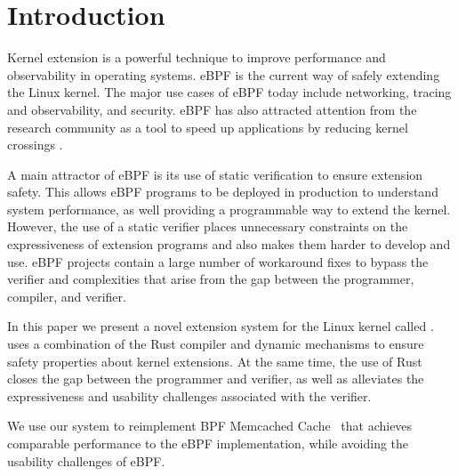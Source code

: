 \section{Introduction}
Kernel extension is a powerful technique to improve performance and
    observability in operating systems.
eBPF is the current way of safely extending the Linux kernel.
The major use cases of eBPF today include networking, tracing and 
    observability, and security.
eBPF has also attracted attention from the research community as
    a tool to speed up applications by reducing kernel crossings \cite{bmc,electrode,bpfxrp}.

A main attractor of eBPF is its use of static verification to ensure extension safety.
This allows eBPF programs to be deployed in production to understand system performance,
    as well providing a programmable way to extend the kernel.
However, the use of a static verifier places unnecessary constraints on the expressiveness
    of extension programs and also makes them harder to develop and use.
eBPF projects contain a large number of workaround fixes to bypass the verifier and 
    complexities that arise from the gap between the programmer, compiler, and verifier.

In this paper we present a novel extension system for the Linux kernel called \projname{}.
\projname{} uses a combination of the Rust compiler and dynamic mechanisms
    to ensure safety properties about kernel extensions.
At the same time, the use of Rust closes the gap between the programmer and verifier,
    as well as alleviates the expressiveness and usability challenges associated with
    the verifier.

We use our system to reimplement BPF Memcached Cache~\cite{bmc} that achieves
    comparable performance to the eBPF implementation, while avoiding the 
    usability challenges of eBPF.

